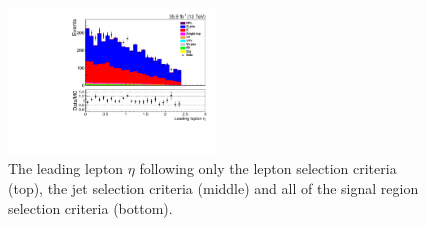 \begin{figure}[h]
\includegraphics[width=0.49\textwidth]{figs/background-estimation/plots/unblinded/prompt_mumu_ttbarInc/lep1Eta_NPL_mumu_wMass_mumu.pdf}
\caption{
The leading lepton $\eta$ following only the lepton selection criteria (top), the jet selection criteria (middle) and all of the signal region selection criteria (bottom).
}
\label{fig:SR_lep1Eta}
\end{figure}

